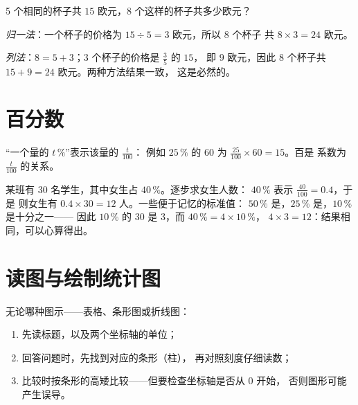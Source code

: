 \begin{example}\label{ex:g6:propdata:methods}
5 个相同的杯子共 $15$ 欧元，8 个这样的杯子共多少欧元？

\emph{归一法}：一个杯子的价格为 $15 \div 5 = 3$ 欧元，所以 8 个杯子
共 $8 \times 3 = 24$ 欧元。

\emph{列法}：$8 = 5 + 3$；3 个杯子的价格是 $\frac{3}{5}$ 的 $15$，
即 $9$ 欧元，因此 8 个杯子共 $15 + 9 = 24$ 欧元。两种方法结果一致，
这是必然的。
\end{example}

\section{百分数}

\begin{definition}[百分数]\label{def:g6:propdata:percent}
“一个量的 $t\,\%$”表示该量的 $\frac{t}{100}$：
例如 $25\,\%$ 的 $60$ 为 $\frac{25}{100} \times 60 = 15$。百是
系数为 $\frac{t}{100}$ 的关系。
\end{definition}

\begin{example}\label{ex:g6:propdata:percent}
某班有 $30$ 名学生，其中女生占 $40\,\%$。逐步求女生人数：
$40\,\%$ 表示 $\frac{40}{100} = 0.4$，于是
则女生有 $0.4 \times 30 = 12$ 人。一些便于记忆的标准值：
$50\,\%$ 是，$25\,\%$ 是，$10\,\%$ 是十分之一——
因此 $10\,\%$ 的 $30$ 是 $3$，而 $40\,\% = 4 \times 10\,\%$，
$4 \times 3 = 12$：结果相同，可以心算得出。
\end{example}

\section{读图与绘制统计图}

\begin{method}[读表或读图]\label{met:g6:propdata:read}
无论哪种图示——表格、条形图或折线图：
\begin{enumerate}
  \item 先读标题，以及两个坐标轴的单位；
  \item 回答问题时，先找到对应的条形（柱），
        再对照刻度仔细读数；
  \item 比较时按条形的高矮比较——但要检查坐标轴是否从 $0$ 开始，
        否则图形可能产生误导。
\end{enumerate}
\end{method}

